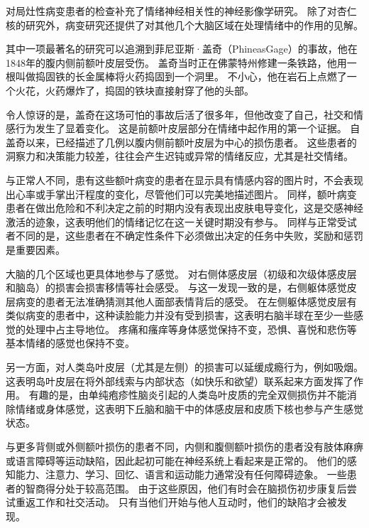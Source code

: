\begin{proposition}[情绪损伤研究] \label{box:42_2}
	
	\quad \quad 对局灶性病变患者的检查补充了情绪神经相关性的神经影像学研究。
	除了对杏仁核的研究外，病变研究还提供了对其他几个大脑区域在处理情绪中的作用的见解。
	
	\quad \quad 其中一项最著名的研究可以追溯到菲尼亚斯·盖奇（PhineasGage）的事故，他在1848年的腹内侧前额叶皮层受伤。
	盖奇当时正在佛蒙特州修建一条铁路，他用一根叫做捣固铁的长金属棒将火药捣固到一个洞里。
	不小心，他在岩石上点燃了一个火花，火药爆炸了，捣固的铁块直接射穿了他的头部。
	
	\quad \quad 令人惊讶的是，盖奇在这场可怕的事故后活了很多年，但他改变了自己，社交和情感行为发生了显着变化。
	这是前额叶皮层部分在情绪中起作用的第一个证据。
	自盖奇以来，已经描述了几例以腹内侧前额叶皮层为中心的损伤患者。
	这些患者的洞察力和决策能力较差，往往会产生迟钝或异常的情绪反应，尤其是社交情绪。
	
	\quad \quad 与正常人不同，患有这些额叶病变的患者在显示具有情感内容的图片时，不会表现出心率或手掌出汗程度的变化，尽管他们可以完美地描述图片。
	同样，额叶病变患者在做出危险和不利决定之前的时期内没有表现出皮肤电导变化，这是交感神经激活的迹象，这表明他们的情绪记忆在这一关键时期没有参与。
	同样与正常受试者不同的是，这些患者在不确定性条件下必须做出决定的任务中失败，奖励和惩罚是重要因素。
	
	\quad \quad 大脑的几个区域也更具体地参与了感觉。
	对右侧体感皮层（初级和次级体感皮层和脑岛）的损害会损害移情等社会感受。
	与这一发现一致的是，右侧躯体感觉皮层病变的患者无法准确猜测其他人面部表情背后的感受。
	在左侧躯体感觉皮层有类似病变的患者中，这种读脸能力并没有受到损害，这表明右脑半球在至少一些感觉的处理中占主导地位。
	疼痛和瘙痒等身体感觉保持不变，恐惧、喜悦和悲伤等基本情绪的感觉也保持不变。
	
	\quad \quad 另一方面，对人类岛叶皮层（尤其是左侧）的损害可以延缓成瘾行为，例如吸烟。
	这表明岛叶皮层在将外部线索与内部状态（如快乐和欲望）联系起来方面发挥了作用。
	有趣的是，由单纯疱疹性脑炎引起的人类岛叶皮质的完全双侧损伤并不能消除情绪或身体感觉，这表明下丘脑和脑干中的体感皮层和皮质下核也参与产生感觉状态。
	
\end{proposition}


与更多背侧或外侧额叶损伤的患者不同，内侧和腹侧额叶损伤的患者没有肢体麻痹或语言障碍等运动缺陷，因此起初可能在神经系统上看起来是正常的。
他们的感知能力、注意力、学习、回忆、语言和运动能力通常没有任何障碍迹象。
一些患者的智商得分处于较高范围。
由于这些原因，他们有时会在脑损伤初步康复后尝试重返工作和社交活动。
只有当他们开始与他人互动时，他们的缺陷才会被发现。


